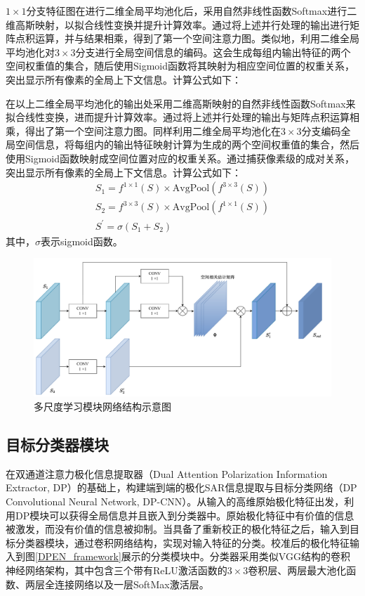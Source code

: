 $1\times 1$分支特征图在进行二维全局平均池化后，采用自然非线性函数Softmax进行二维高斯映射，以拟合线性变换并提升计算效率。通过将上述并行处理的输出进行矩阵点积运算，并与结果相乘，得到了第一个空间注意力图。类似地，利用二维全局平均池化对$3\times 3$分支进行全局空间信息的编码。这会生成每组内输出特征的两个空间权重值的集合，随后使用Sigmoid函数将其映射为相应空间位置的权重关系，突出显示所有像素的全局上下文信息。计算公式如下：

在以上二维全局平均池化的输出处采用二维高斯映射的自然非线性函数Softmax来拟合线性变换，进而提升计算效率。通过将上述并行处理的输出与矩阵点积运算相乘，得出了第一个空间注意力图。同样利用二维全局平均池化在$3\times 3$分支编码全局空间信息，将每组内的输出特征映射计算为生成的两个空间权重值的集合，然后使用Sigmoid函数映射成空间位置对应的权重关系。通过捕获像素级的成对关系，突出显示所有像素的全局上下文信息。计算公式如下：
\begin{gather}
    S_1=f^{1\times 1}\left( S \right) \times \mathrm{AvgPool}\left( f^{3\times 3}\left( S \right) \right)
    \\
    S_2=f^{3\times 3}\left( S \right) \times \mathrm{AvgPool}\left( f^{1\times 1}\left( S \right) \right)
    \\
    S^{\prime}=\sigma \left( S_1+S_2 \right)
\end{gather}
其中，$\sigma$表示sigmoid函数。

\begin{figure}[ht!]
    \centering
    \includegraphics[width=14cm]{pic/chapter3/跨空间学习.pdf}
    \caption{多尺度学习模块网络结构示意图}
    \label{DPEN_CSL}
\end{figure}

\subsection{目标分类器模块}
在双通道注意力极化信息提取器（Dual Attention Polarization Information Extractor, DP）的基础上，构建端到端的极化SAR信息提取与目标分类网络（DP Convolutional Neural Network, DP-CNN）。从输入的高维原始极化特征出发，利用DP模块可以获得全局信息并且嵌入到分类器中。原始极化特征中有价值的信息被激发，而没有价值的信息被抑制。当具备了重新校正的极化特征之后，输入到目标分类器模块，通过卷积网络结构，实现对输入特征的分类。校准后的极化特征输入到图\ref{DPEN_framework}展示的分类模块中。分类器采用类似VGG结构的卷积神经网络架构，其中包含三个带有ReLU激活函数的$3\times 3$卷积层、两层最大池化函数、两层全连接网络以及一层SoftMax激活层。

